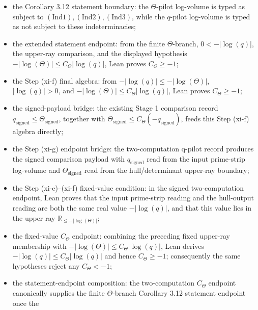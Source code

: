 \documentclass[11pt]{article}
\begin{document}
\begin{itemize}
  the statement-level value \(-|\log(\Theta)|\in\mathbb{R}\cup\{+\infty\}\)
  is represented by an explicit finite/\(+\infty\) split, and the
  hull/determinant upper-ray datum forces the finite real branch, explicitly
  excluding the \(+\infty\) branch; Lean also exposes the resulting real
  \(\Theta\)-log-volume and proves the \(q\)-pilot upper-ray comparison against
  that real value;
\item the Corollary 3.12 statement boundary:
  the \(\Theta\)-pilot log-volume is typed as subject to
  \((\mathrm{Ind1}),(\mathrm{Ind2}),(\mathrm{Ind3})\), while the \(q\)-pilot
  log-volume is typed as not subject to these indeterminacies;
\item the extended statement endpoint:
  from the finite \(\Theta\)-branch, \(0<-|\log(q)|\), the upper-ray comparison,
  and the displayed hypothesis
  \(-|\log(\Theta)|\le C_\Theta|\log(q)|\), Lean proves \(C_\Theta\ge-1\);
\item the Step (xi-f) final algebra:
  from \(-|\log(q)|\le-|\log(\Theta)|\), \(|\log(q)|>0\), and
  \(-|\log(\Theta)|\le C_\Theta|\log(q)|\), Lean proves \(C_\Theta\ge-1\);
\item the signed-payload bridge:
  the existing Stage 1 comparison record \(q_{\mathrm{signed}}\le
  \Theta_{\mathrm{signed}}\), together with
  \(\Theta_{\mathrm{signed}}\le C_\Theta(-q_{\mathrm{signed}})\), feeds this
  Step (xi-f) algebra directly;
\item the Step (xi-g) endpoint bridge:
  the two-computation q-pilot record produces the signed comparison payload
  with \(q_{\mathrm{signed}}\) read from the input prime-strip log-volume and
  \(\Theta_{\mathrm{signed}}\) read from the hull/determinant upper-ray
  boundary;
\item the Step (xi-e)--(xi-f) fixed-value condition:
  in the signed two-computation endpoint, Lean proves that the input
  prime-strip reading and the hull-output reading are both the same real value
  \(-|\log(q)|\), and that this value lies in the upper ray
  \(\mathbb{R}_{\le-|\log(\Theta)|}\);
\item the fixed-value \(C_\Theta\) endpoint:
  combining the preceding fixed upper-ray membership with
  \(-|\log(\Theta)|\le C_\Theta|\log(q)|\), Lean derives
  \(-|\log(q)|\le C_\Theta|\log(q)|\) and hence \(C_\Theta\ge-1\);
  consequently the same hypotheses reject any \(C_\Theta<-1\);
\item the statement-endpoint composition:
  the two-computation \(C_\Theta\) endpoint canonically supplies the finite
  \(\Theta\)-branch Corollary 3.12 statement endpoint once the

\end{itemize}
\end{document}
